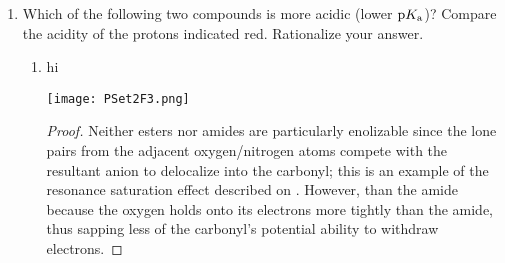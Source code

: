 \documentclass[../psets.tex]{subfiles}
\begin{document}
\begin{enumerate}
\begin{enumerate}
\begin{proof}
            Once acetic acid adds in, its proton will be highly acidic and easily deprotonated by a base in solution. This could be the solvent, but it could also be , , or . Among these choices, I feel like  would do the deprotonation the most often because even though there's not much of it present, there will still be more of it than  (and it's more basic than ) and for , $\pKa=-6.1$. This deprotonation yields the final product.
        \end{proof}
        \item Suggest how the minor products could be formed and draw the key intermediate(s) involved.
        \begin{proof}
            {\color{white}hi}
            \begin{center}
                \texttt{[image: PSet2Q2b.png]}
            \end{center}
            I suggest that the final cation before  adds in has partial nonclassical, 3c-2e character. It will still favor the homoconjugation-stabilized form drawn in part (a) --- accounting for why that gives the major product --- but a Mulliken partial charge on the other carbons could also lead to  addition to those resonance forms followed by deprotonation, as drawn in part (a).
        \end{proof}
    \end{enumerate}
    \pagebreak
    \item Which of the following two compounds is more acidic (lower $\textup{p}K_\textup{a}$)? Compare the acidity of the protons indicated red. Rationalize your answer.
    \begin{enumerate}
        \item {\color{white}hi}
        \begin{center}
            \texttt{[image: PSet2F3.png]}
        \end{center}
        \begin{proof}
            Neither esters nor amides are particularly enolizable since the lone pairs from the adjacent oxygen/nitrogen atoms compete with the resultant anion to delocalize into the carbonyl; this is an example of the resonance saturation effect described on \textcite[282]{bib:Anslyn}. However,  than the amide because the oxygen holds onto its electrons more tightly than the amide, thus sapping less of the carbonyl's potential ability to withdraw electrons.\par

\end{proof}
\end{enumerate}
\end{enumerate}
\end{document}
